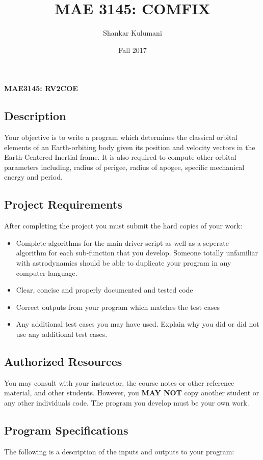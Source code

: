 \documentclass[11pt, reqno]{article}    %
\title{MAE 3145: COMFIX}
\author{Shankar Kulumani}
\date{Fall 2017}                          %
\begin{document}
\begin{center}
{\Large \textbf{MAE3145: RV2COE}}
\end{center}
\subsection*{Description}

Your objective is to write a program which determines the classical orbital elements of an Earth-orbiting body given its position and velocity vectors in the Earth-Centered Inertial frame.
It is also required to compute other orbital parameters including, radius of perigee, radius of apogee, specific mechanical energy and period.

\subsection*{Project Requirements}
After completing the project you must submit the hard copies of your work:
\begin{itemize}
    \item Complete algorithms for the main driver script as well as a seperate algorithm for each sub-function that you develop.
        Someone totally unfamiliar with astrodynamics should be able to duplicate your program in any computer language.
    \item Clear, concise and properly documented and tested code
    \item Correct outputs from your program which matches the test cases
    \item Any additional test cases you may have used. 
        Explain why you did or did not use any additional test cases.
\end{itemize}

\subsection*{Authorized Resources}
You may consult with your instructor, the course notes or other reference material, and other students. 
However, you \textbf{MAY NOT} copy another student or any other individuals code. 
The program you develop must be your own work.

\subsection*{Program Specifications}
The following is a description of the inputs and outputs to your program:
\end{document}
